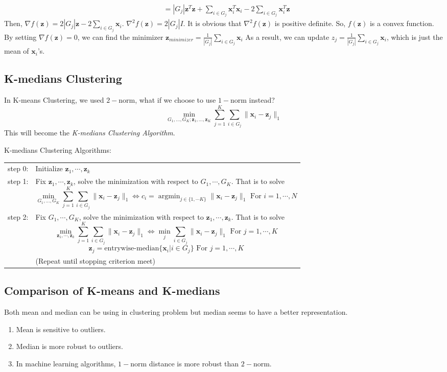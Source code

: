 \documentclass[11pt]{article}
\newcommand{\vx}{\mathbf{x}}
\newcommand{\vz}{\mathbf{z}}
\begin{document}
\begin{enumerate}
\begin{enumerate}
\begin{align*}
&= |G_j|\vz^T \vz +\sum_{i \in G_j}\vx_i^T \vx_i -2\sum_{i \in G_j}\vx_i^T\vz
\end{align*} Then, $\nabla f(\vz)= 2|G_j|\vz -2\sum_{i \in G_j}\vx_i$. $\nabla^2 f(\vz) = 2 |G_j| I$. It is obvious that $\nabla^2 f(\vz)$ is positive definite. So, $f(\vz)$ is a convex function. By setting $\nabla f(\vz) = 0$, we can find the minimizer $\vz_{minimizer} = \frac{1}{|G_j|}\sum_{i \in G_j}\vx_i$ As a result, we can update $z_j = \frac{1}{|G_j|} \sum_{i \in G_j} \vx_i$, which is just the mean of $\vx_i$'s.
\end{enumerate}
\end{enumerate}

\subsection{K-medians Clustering}
In K-means Clustering, we used $2-$norm, what if we choose to use $1-$norm instead? $$\min_{G_1, \ldots, G_K; \vz_1, \ldots, \vz_K} \sum_{j=1}^{K} \sum_{i \in G_j} \|\vx_i - \vz_j\|_1$$ This will become the \textit{K-medians Clustering Algorithm}.

K-medians Clustering Algorithms:\\
\begin{tabular}{lp{15cm}}
step 0:& Initialize $\vz_1, \cdots, \vz_k$\\
step 1:& Fix $\vz_1, \cdots, \vz_k$, solve the minimization with respect to $G_1, \cdots, G_K$. That is to solve 
$$\min_{G_1, \ldots, G_K} \sum_{j=1}^{K} \sum_{i \in G_j} \|\vx_i - \vz_j\|_1 \iff c_i = \mathop{\arg \min}_{j \in \{1, \cdots K\}}\| \vx_i - \vz_j \|_1 \text{ For } i =1, \cdots, N$$\\
step 2:& Fix $G_1, \cdots, G_K$, solve the minimization with respect to $\vz_1, \cdots, \vz_k$. That is to solve $$\min_{\vz_1, \cdots, \vz_k} \sum_{j=1}^{K} \sum_{i \in G_j} \|\vx_i - \vz_j\|_1 \iff \min_{j} \sum_{i \in G_j} \| \vx_i - \vz_j\|_1 \text{ For } j= 1, \cdots, K$$ $$\vz_j = \text{entrywise-median}\{\vx_i | i \in G_j \} \text{ For } j = 1, \cdots, K$$\\
&(Repeat until stopping criterion meet)
\end{tabular}

\subsection{Comparison of K-means and K-medians}
Both mean and median can be using in clustering problem but median seems to have a better representation. 
\begin{enumerate}
\item Mean is sensitive to outliers.
\item Median is more robust to outliers.
\item In machine learning algorithms, $1-$norm distance is more robust than $2-$norm.
\end{enumerate}
\end{document}
